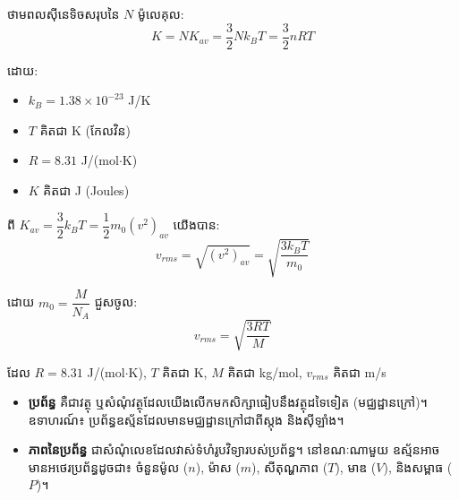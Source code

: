 	\noindent ថាមពលស៊ីនេទិចសរុបនៃ $N$ ម៉ូលេគុល:
	\begin{equation}
		\boxed{K = NK_{av} = \frac{3}{2}Nk_BT = \frac{3}{2}nRT}
	\end{equation}
	
	\noindent ដោយ:
	\begin{itemize}
		\item $k_B = 1.38\times10^{-23}$ {\englishfont J/K}
		\item $T$ គិតជា {\englishfont K} (កែលវិន)
		\item $R = 8.31$ {\englishfont J/(mol$\cdot$K)}
		\item $K$ គិតជា {\englishfont J (Joules)}
	\end{itemize}
	
	
	\noindent ពី $K_{av} = \dfrac{3}{2}k_BT = \dfrac{1}{2}m_0(v^2)_{av}$ យើងបាន:
	\begin{equation}
		v_{rms} = \sqrt{(v^2)_{av}} = \sqrt{\frac{3k_BT}{m_0}}
	\end{equation}
	
	\noindent ដោយ $m_0 = \dfrac{M}{N_A}$ ជួសចូល:
	\begin{equation}
		\boxed{v_{rms} = \sqrt{\frac{3RT}{M}}}
	\end{equation}
	
	\noindent ដែល $R=8.31$ {\englishfont J/(mol$\cdot$K)}, $T$ គិតជា {\englishfont K}, $M$ គិតជា {\englishfont kg/mol}, $v_{rms}$ គិតជា {\englishfont m/s}
	
	\tanbgdivider
	\newpage
	
	\begin{center}
	\end{center}
	
	\vspace{0.5cm}
	
	
	\begin{itemize}
		\item \textbf{ប្រព័ន្ធ} គឺជាវត្ថុ ឬសំណុំវត្ថុដែលយើងលើកមកសិក្សាធៀបនឹងវត្ថុដទៃទៀត (មជ្ឈដ្ឋានក្រៅ)។ ឧទាហរណ៍៖ ប្រព័ន្ធឧស្ម័នដែលមានមជ្ឈដ្ឋានក្រៅជាពីស្តុង និងស៊ីឡាំង។
	\end{itemize}
	
	\begin{itemize}
		\item \textbf{ភាពនៃប្រព័ន្ធ} ជាសំណុំលេខដែលវាស់ទំហំរូបវិទ្យារបស់ប្រព័ន្ធ។ នៅខណៈណាមួយ ឧស្ម័នអាចមានអថេរប្រព័ន្ធដូចជា៖ ចំនួនម៉ូល ($n$), ម៉ាស ($m$), សីតុណ្ហភាព ($T$), មាឌ ($V$), និងសម្ពាធ ($P$)។
	\end{itemize}
	
